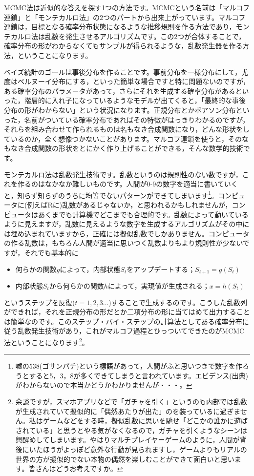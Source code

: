 \documentclass{ltjsbook}
\begin{document}
MCMC法は近似的な答えを探す1つの方法です。MCMCという名前は「マルコフ連鎖」と「モンテカルロ法」の2つのパートから出来上がっています。マルコフ連鎖は，目標となる確率分布状態になるような推移規則を作る方法であり，モンテカルロ法は乱数を発生させるアルゴリズムです。この2つが合体することで，確率分布の形がわからなくてもサンプルが得られるような，乱数発生器を作る方法，ということになります。

ベイズ統計のゴールは事後分布を作ることです。事前分布を一様分布にして，尤度はベルヌーイ分布にする，といった簡単な場合ですと特に問題ないのですが，ある確率分布のパラメータがあって，さらにそれを生成する確率分布があるといった，階層的に入れ子になっているようなモデルが出てくると，「最終的な事後分布の形がわからない」という状況になります。正規分布とかポアソン分布といった，名前がついている確率分布であればその特徴がはっきりわかるのですが，それらを組み合わせて作られるものは名もなき合成関数になり，どんな形状をしているのか，全く想像つかないことがあります。マルコフ連鎖を使うと，そのなもなき合成関数の形状をとにかく作り上げることができる，そんな数学的技術です。

モンテカルロ法は乱数発生技術です。乱数というのは規則性のない数ですが，これを作るのはなかなか難しいものです。人間が0-9の数字を適当に書いていくと，知らず知らずのうちに均等でないパターンができてしまいます\footnote{嘘の538(ゴサンパチ)という標語があって，人間がふと思いつきで数字を作ろうとすると5，3，8が多くできてしまうと言われています。エビデンス(出典)がわからないので本当かどうかわかりませんが・・・。}。コンピュータに(例えばRに)乱数があるじゃないか，と思われるかもしれませんが，コンピュータはあくまでも計算機でどこまでも合理的です。乱数によって動いているように見えますが，乱数に見えるような数字を生成するアルゴリズムがその中には埋め込まれていますから，正確には擬似乱数でしかありません。コンピュータの作る乱数は，もちろん人間が適当に思いつく乱数よりもより規則性が少ないですが，それでも基本的に
\begin{itemize}
    \item 何らかの関数$g$によって，内部状態$S_t$をアップデートする；$S_{t+1}=g(S_t)$
    \item 内部状態$S_t$から何らかの関数$h$によって，実現値が生成される；$x = h(S_t)$
\end{itemize}
というステップを反復($t=1,2,3\ldots$)することで生成するのです。こうした乱数列ができれば，それを正規分布の形だとか二項分布の形に当てはめて出力することは簡単なのです。このステップ・バイ・ステップの計算法としてある確率分布に従う乱数発生技術があり，これがマルコフ過程とひっついてできたのがMCMC法ということになります\footnote{余談ですが，スマホアプリなどで「ガチャを引く」というのも内部では乱数が生成されていて擬似的に「偶然あたりが出た」のを装っているに過ぎません。私はゲームなどをする時，擬似乱数に思いを馳せ「どこかの誰かに遊ばされている」と思うとやる気がなくなるので，ガチャを引くようなシーンは興醒めしてしまいます。やはりマルチプレイヤーゲームのように，人間が背後にいたほうがよっぽど意外な行動が見られますし，ゲームよりもリアルの世界の方が擬似的でない本物の偶然を楽しむことができて面白いと思います。皆さんはどうお考えですか。}。
\end{document}
